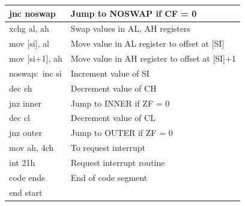 \documentclass[10pt,a4paper]{article}
\begin{document}
\begin{flushleft}
\begin{table}[htb]
{\begin{tabular}{|l|l|}
\hline
jnc noswap                                                       & Jump to NOSWAP if CF = 0                      \\
\hline
xchg al, ah                                                      & Swap values in AL, AH registers               \\
\hline
mov [si], al                                                     & Move value in AL register to offset at [SI]   \\
\hline
mov [si+1], ah                                                   & Move value in AH register to offset at [SI]+1 \\
\hline
noswap:~inc si                                                   & Increment value of SI                         \\
\hline
dec ch                                                           & Decrement value of CH                         \\
\hline
jnz inner                                                        & Jump to INNER if ZF = 0                       \\
\hline
dec cl                                                           & Decrement value of CL                         \\
\hline
jnz outer                                                        & Jump to OUTER if ZF = 0                       \\
\hline
mov ah, 4ch                                                & To request interrupt                          \\
\hline
int 21h                                                          & Request interrupt routine                     \\ 
\hline
code ends                                                        & End of code segment                           \\
\hline
end start                                                        &                                               \\
\hline
\end{tabular}
}
\end{table}

\newpage

\end{flushleft}
\end{document}

